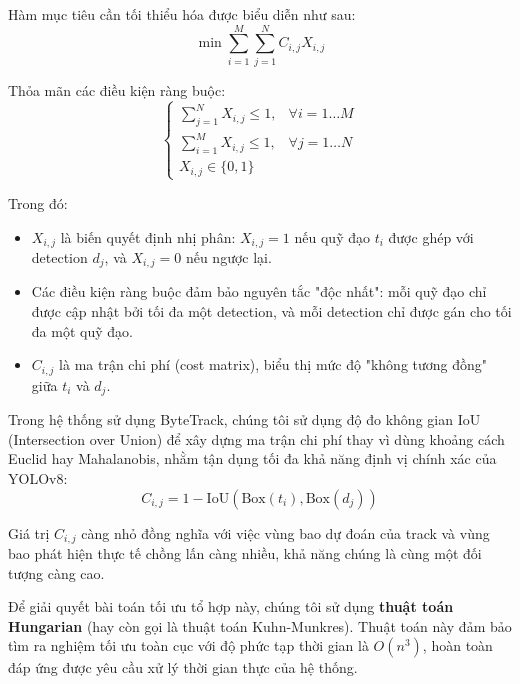 Hàm mục tiêu cần tối thiểu hóa được biểu diễn như sau:
\begin{equation}
    \min \sum_{i=1}^{M} \sum_{j=1}^{N} C_{i,j} X_{i,j}
\end{equation}

Thỏa mãn các điều kiện ràng buộc:
\begin{equation}
    \begin{cases}
        \sum_{j=1}^{N} X_{i,j} \le 1, & \forall i = 1 \dots M \\
        \sum_{i=1}^{M} X_{i,j} \le 1, & \forall j = 1 \dots N \\
        X_{i,j} \in \{0, 1\}
    \end{cases}
\end{equation}

Trong đó:
\begin{itemize}
    \item $X_{i,j}$ là biến quyết định nhị phân: $X_{i,j} = 1$ nếu quỹ đạo $t_i$ được ghép với detection $d_j$, và $X_{i,j} = 0$ nếu ngược lại.
    \item Các điều kiện ràng buộc đảm bảo nguyên tắc "độc nhất": mỗi quỹ đạo chỉ được cập nhật bởi tối đa một detection, và mỗi detection chỉ được gán cho tối đa một quỹ đạo.
    \item $C_{i,j}$ là ma trận chi phí (cost matrix), biểu thị mức độ "không tương đồng" giữa $t_i$ và $d_j$.
\end{itemize}

Trong hệ thống sử dụng ByteTrack, chúng tôi sử dụng độ đo không gian IoU (Intersection over Union) để xây dựng ma trận chi phí thay vì dùng khoảng cách Euclid hay Mahalanobis, nhằm tận dụng tối đa khả năng định vị chính xác của YOLOv8:
\begin{equation}
    C_{i,j} = 1 - \text{IoU}(\text{Box}(t_i), \text{Box}(d_j))
\end{equation}

Giá trị $C_{i,j}$ càng nhỏ đồng nghĩa với việc vùng bao dự đoán của track và vùng bao phát hiện thực tế chồng lấn càng nhiều, khả năng chúng là cùng một đối tượng càng cao.

Để giải quyết bài toán tối ưu tổ hợp này, chúng tôi sử dụng \textbf{thuật toán Hungarian} (hay còn gọi là thuật toán Kuhn-Munkres). Thuật toán này đảm bảo tìm ra nghiệm tối ưu toàn cục với độ phức tạp thời gian là $O(n^3)$, hoàn toàn đáp ứng được yêu cầu xử lý thời gian thực của hệ thống.

